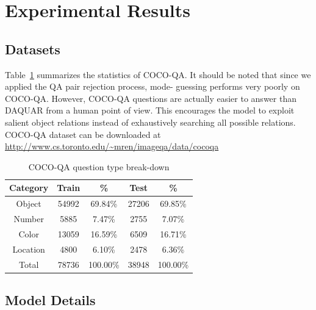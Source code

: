 \documentclass{article} %
\renewcommand{\#}[1]{\textbf{#1}}
\begin{document}
\section{Experimental Results}

\subsection{Datasets}

Table~\ref{tab:dataset_category_stats} summarizes the statistics of  COCO-QA.
It should be noted that since we applied the QA pair rejection process,  mode-
guessing performs very poorly on COCO-QA. However, COCO-QA questions  are
actually easier to answer than DAQUAR from a human point of view. This
encourages the model to exploit salient object relations instead of
exhaustively searching all possible relations. COCO-QA dataset can be
downloaded at \url{http://www.cs.toronto.edu/~mren/imageqa/data/cocoqa}

\begin{table}
\caption{COCO-QA question type break-down}
\label{tab:dataset_category_stats}
\vskip 0.15in
\begin{center}
\begin{small}
\begin{sc}
\begin{tabular}{c c c c c}
\hline
Category & Train & \%       & Test  & \%       \\
\hline
Object   & 54992 & 69.84\%  & 27206 & 69.85\%  \\
Number   & 5885  & 7.47\%   & 2755  & 7.07\%   \\
Color    & 13059 & 16.59\%  & 6509  & 16.71\%  \\
Location & 4800  & 6.10\%   & 2478  & 6.36\%   \\
\hline
Total    & 78736 & 100.00\% & 38948 & 100.00\% \\
\hline
\end{tabular}
\end{sc}
\end{small}
\end{center}
\end{table}

\subsection{Model Details}
\end{document}
